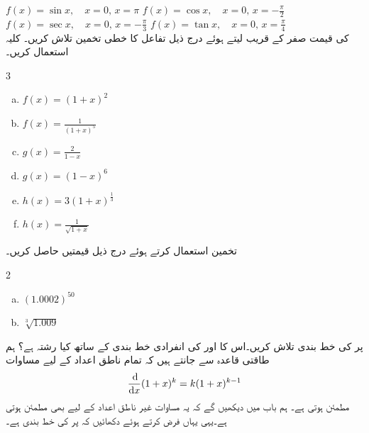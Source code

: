 $f(x)=\sin x,\quad x=0,\, x=\pi$
$f(x)=\cos x,\quad x=0,\, x=-\tfrac{\pi}{2}$
$f(x)=\sec x,\quad x=0,\, x=-\tfrac{\pi}{3}$
$f(x)=\tan x,\quad x=0,\, x=\tfrac{\pi}{4}$
\\
 کی قیمت صفر کے قریب لیتے ہوئے درج ذیل تفاعل کا خطی تخمین تلاش کریں۔ کلیہ  استعمال کریں۔
\begin{multicols}{3}
\begin{enumerate}[a.]
\item
$f(x)=(1+x)^2$
\item
$f(x)=\frac{1}{(1+x)^5}$
\item
$g(x)=\frac{2}{1-x}$
\item
$g(x)=(1-x)^6$
\item
$h(x)=3(1+x)^{\tfrac{1}{3}}$
\item
$h(x)=\frac{1}{\sqrt{1+x}}$
\end{enumerate}
\end{multicols}
\quad
تخمین  استعمال کرتے ہوئے درج ذیل قیمتیں حاصل کریں۔
\begin{multicols}{2}
\begin{enumerate}[a.]
\item
$(1.0002)^{50}$
\item
$\sqrt[3]{1.009}$
\end{enumerate}
\end{multicols}
 پر  کی خط بندی تلاش کریں۔اس کا  اور  کی انفرادی خط بندی کے ساتھ کیا رشتہ ہے؟
ہم طاقتی قاعدہ سے جانتے ہیں کہ تمام ناطق اعداد  کے لیے مساوات
\begin{align*}
\frac{\dif}{\dif x}(1+x)^k=k(1+x)^{k-1}
\end{align*}
مطمئن ہوتی ہے۔ ہم  باب  میں دیکھیں گے کہ یہ مساوات غیر ناطق اعداد کے لیے بھی مطمئن ہوتی ہے۔یہی یہاں فرض کرتے ہوئے دکھائیں کہ  پر  کی خط بندی  ہے۔


